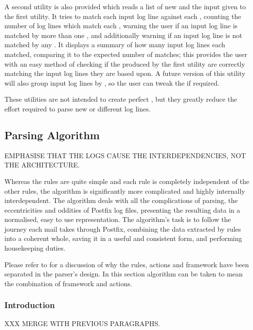 A second utility is also provided which reads a list of new \regexes{} and
the input given to the first utility.  It tries to match each input log
line against each \regex{}, counting the number of log lines which match
each \regex{}, warning the user if an input log line is matched by more
than one \regex{}, and additionally warning if an input log line is not
matched by any \regex{}.  It displays a summary of how many input log lines
each \regex{} matched, comparing it to the expected number of matches; this
provides the user with an easy method of checking if the \regexes{}
produced by the first utility are correctly matching the input log lines
they are based upon.  A future version of this utility will also group
input log lines by \regex{}, so the user can tweak the \regexes{} if
required.

These utilities are not intended to create perfect \regexes{}, but they
greatly reduce the effort required to parse new or different log lines.

\subsection{Parsing Algorithm}

\label{parsing-algorithm}

EMPHASISE THAT THE LOGS CAUSE THE INTERDEPENDENCIES, NOT THE
ARCHITECTURE\@.

Whereas the rules are quite simple and each rule is completely independent
of the other rules, the algorithm is significantly more complicated and
highly internally interdependent.  The algorithm deals with all the
complications of parsing, the eccentricities and oddities of Postfix log
files, presenting the resulting data in a normalised, easy to use
representation.  The algorithm's task is to follow the journey each mail
takes through Postfix, combining the data extracted by rules into a
coherent whole, saving it in a useful and consistent form, and performing
housekeeping duties.

Please refer to  for a discussion of why the
rules, actions and framework have been separated in the parser's design.
In this section algorithm can be taken to mean the combination of framework
and actions.

\subsubsection{Introduction}

XXX MERGE WITH PREVIOUS PARAGRAPHS\@.

